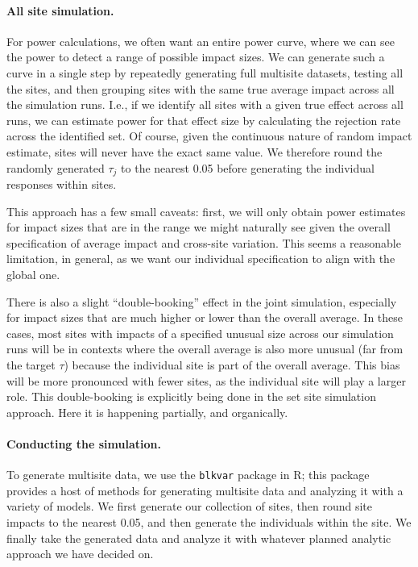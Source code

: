 \documentclass[]{article}
\begin{document}
	\paragraph{All site simulation.} For power calculations, we often want an entire power curve, where we can see the power to detect a range of possible impact sizes.
	We can generate such a curve in a single step by repeatedly generating full multisite datasets, testing all the sites, and then grouping sites with the same true average impact across all the simulation runs.
	I.e., if we identify all sites with a given true effect across all runs, we can estimate power for that effect size by calculating the rejection rate across the identified set.
	Of course, given the continuous nature of random impact estimate, sites will never have the exact same value.
	We therefore round the randomly generated $\tau_j$ to the nearest 0.05 before generating the individual responses within sites.
	
	This approach has a few small caveats: first, we will only obtain power estimates for impact sizes that are in the range we might naturally see given the overall specification of average impact and cross-site variation.
	This seems a reasonable limitation, in general, as we want our individual specification to align with the global one.
	
	There is also a slight ``double-booking'' effect in the joint simulation, especially for impact sizes that are much higher or lower than the overall average.
	In these cases,  most sites with impacts of a specified unusual size across our simulation runs will be in contexts where the overall average is also more unusual (far from the target $\tau$) because the individual site is part of the overall average.
	This bias will be more pronounced with fewer sites, as the individual site will play a larger role.
	This double-booking is explicitly being done in the set site simulation approach.
	Here it is happening partially, and organically.
	
	
	\paragraph{Conducting the simulation.}
	To generate multisite data, we use the \texttt{blkvar} package in R; this package provides a host of methods for generating multisite data and analyzing it with a variety of models.
	We first generate our collection of sites, then round site impacts to the nearest 0.05, and then generate the individuals within the site.
	We finally take the generated data and analyze it with whatever planned analytic approach we have decided on.
	
\end{document}
